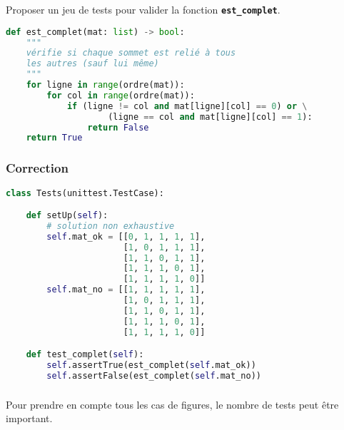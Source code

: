 \documentclass[svgnames,11pt]{beamer}
\begin{document}
\begin{frame}[fragile]
\begin{activite}
Proposer un jeu de tests pour valider la fonction \textbf{\texttt{est\_complet}}.
\end{activite}
    \begin{lstlisting}[language=Python , basicstyle=\ttfamily\small, xleftmargin=0.2em, xrightmargin=-4em]
def est_complet(mat: list) -> bool:
    """
    vérifie si chaque sommet est relié à tous
    les autres (sauf lui même)
    """
    for ligne in range(ordre(mat)):
        for col in range(ordre(mat)):
            if (ligne != col and mat[ligne][col] == 0) or \
                    (ligne == col and mat[ligne][col] == 1):
                return False
    return True
\end{lstlisting}

\end{frame}
\begin{frame}[fragile]
    \frametitle{Correction}

\begin{lstlisting}[language=Python , basicstyle=\ttfamily\small, xleftmargin=0.2em, xrightmargin=0em]
class Tests(unittest.TestCase):

    def setUp(self):
        # solution non exhaustive
        self.mat_ok = [[0, 1, 1, 1, 1],
                       [1, 0, 1, 1, 1],
                       [1, 1, 0, 1, 1],
                       [1, 1, 1, 0, 1],
                       [1, 1, 1, 1, 0]]
        self.mat_no = [[1, 1, 1, 1, 1],
                       [1, 0, 1, 1, 1],
                       [1, 1, 0, 1, 1],
                       [1, 1, 1, 0, 1],
                       [1, 1, 1, 1, 0]]

    def test_complet(self):
        self.assertTrue(est_complet(self.mat_ok))
        self.assertFalse(est_complet(self.mat_no))
\end{lstlisting}

\end{frame}
\begin{frame}
    \frametitle{}

    \begin{aretenir}[]
    Pour prendre en compte tous les cas de figures, le nombre de tests peut être important.
    \end{aretenir}
\end{frame}
\end{document}
